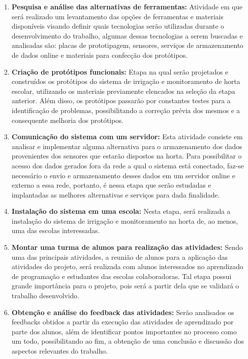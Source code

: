 \documentclass[12pt]{article}
\begin{document}
    \begin{enumerate}
		\item \label{activity:pesquisa} \textbf{Pesquisa e análise das alternativas de ferramentas:} Atividade em que será realizado um levantamento das opções de ferramentas e materiais disponíveis visando definir quais tecnologias serão utilizadas durante o desenvolvimento do trabalho, algumas dessas tecnologias a serem buscadas e analisadas são: placas de prototipagem, sensores, serviços de armazenamento de dados online e materiais para confecção dos protótipos.
        
        \item \label{activity:prototipos} \textbf{Criação de protótipos funcionais:} Etapa na qual serão projetados e construídos os protótipos do sistema de irrigação e monitoramento de horta escolar, utilizando os materiais previamente elencados na seleção da etapa anterior. Além disso, os protótipos passarão por constantes testes para a identificação de problemas, possibilitando a correção prévia dos mesmos e a consequente melhoria dos protótipos.
        
        \item \label{activity:servidor} \textbf{Comunicação do sistema com um servidor:} Esta atividade consiste em analisar e implementar alguma alternativa para o armazenamento dos dados provenientes dos sensores que estarão dispostos na horta. Para possibilitar o acesso dos dados gerados fora da rede a qual o sistema está conectado, faz-se necessário o envio e armazenamento desses dados em um servidor online e externo a essa rede, portanto, é nessa etapa que serão estudadas e implantadas as melhores alternativas e serviços para dada finalidade.
        
        \item \label{activity:instalacao} \textbf{Instalação do sistema em uma escola:} Nesta etapa, será realizada a instalação do sistema de irrigação e monitoramento  na horta de, ao menos, uma das escolas interessadas.  
        
        \item \label{activity:alunos} \textbf{Montar uma turma de alunos para realização das atividades: } Sendo uma das principais atividades, a reunião de alunos para a aplicação das atividades do projeto, será realizada com alunos interessados no aprendizado de programação e estudantes das escolas colaboradoras. Tal etapa possui grande importância para o projeto, pois será a partir dela que se validará o trabalho desenvolvido.  
        
        \item \label{activity:feedback} \textbf{Obtenção e análise do feedback das atividades:} Serão analisados os feedbacks obtidos a partir da execução das atividades de aprendizado por parte dos alunos, além de identificar pontos importantes no processo como um todo, possibilitando ao fim, a obtenção de uma conclusão e discussão dos aspectos relevantes do trabalho. 
        
    \end{enumerate}
    
\end{document}
